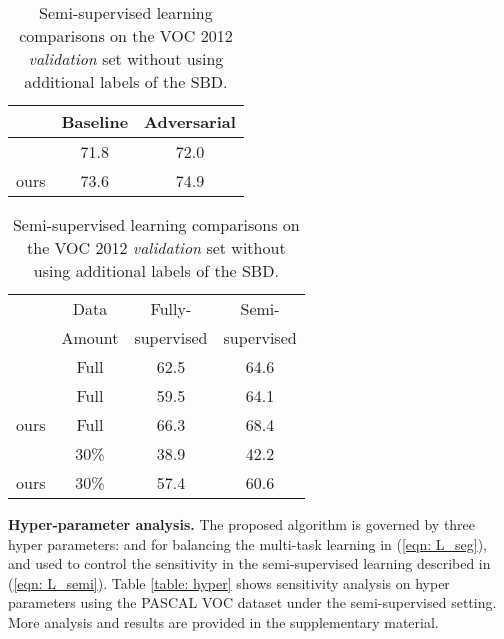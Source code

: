 \documentclass{bmvc2k}
\begin{document}
	\begin{table}
		\begin{minipage}[t]{.49\linewidth}
			\scriptsize
			\caption{Adversarial learning comparison with \cite{luc2016semantic} on the VOC 2012 \emph{validation} set.}
			\vspace{5mm}
			\label{table: adversarial_comp}
			\centering
			\begin{tabular}{lcc}
				\toprule
				& Baseline & Adversarial \\
				\midrule
				\cite{luc2016semantic} & 71.8 & 72.0\\
				ours & 73.6 & 74.9 \\
				
				\bottomrule
			\end{tabular}
		\end{minipage}
\hfill
		\begin{minipage}[t]{.49\linewidth}
			
			\scriptsize
			\caption{Semi-supervised learning comparisons on the VOC 2012 \emph{validation} set without using additional labels of the SBD.}
			\vspace{1mm}
			\label{table: semi_comp}
			\centering
			\begin{tabular}{lccc}
				\toprule
				& Data & Fully- & Semi- \\
				& Amount& supervised & supervised \\
				\midrule
				\cite{papandreou2015weakly} & Full & 62.5 & 64.6 \\
				\cite{souly2017semi} & Full & 59.5 & 64.1\\
				ours & Full & 66.3 & 68.4 \\
				\midrule
				\cite{souly2017semi} & 30\% & 38.9 & 42.2\\
				ours & 30\% & 57.4 & 60.6 \\
				\bottomrule
			\end{tabular}
		\end{minipage}
		\vspace{-5mm}
	\end{table}
	
	
	\vspace{-2mm}	
	{\flushleft \bf Hyper-parameter analysis.}
The proposed algorithm is governed by three hyper parameters:  and  for balancing the multi-task learning in (\ref{eqn: L_seg}), and  used to control the sensitivity in the semi-supervised learning described in (\ref{eqn: L_semi}).
Table \ref{table: hyper} shows sensitivity analysis on hyper parameters using the PASCAL VOC dataset under the semi-supervised setting. 
More analysis and results are provided in the supplementary material.
\end{document}
